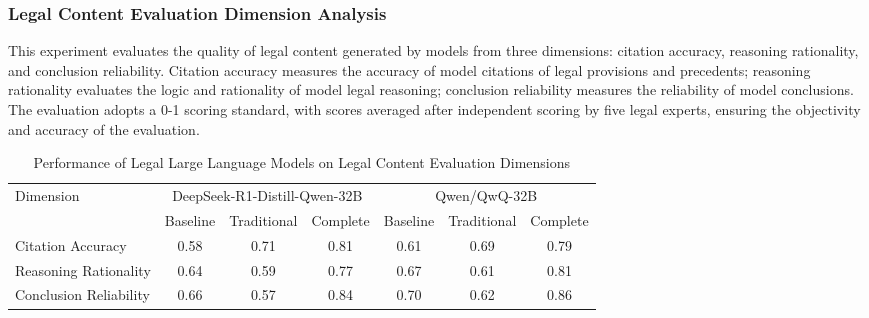 \documentclass{article}
\theoremstyle{plain}
\theoremstyle{definition}
\begin{document}
\FloatBarrier
\subsubsection{Legal Content Evaluation Dimension Analysis}
\label{sec4.2.3}

This experiment evaluates the quality of legal content generated by models from three dimensions: citation accuracy, reasoning rationality, and conclusion reliability. Citation accuracy measures the accuracy of model citations of legal provisions and precedents; reasoning rationality evaluates the logic and rationality of model legal reasoning; conclusion reliability measures the reliability of model conclusions. The evaluation adopts a 0-1 scoring standard, with scores averaged after independent scoring by five legal experts, ensuring the objectivity and accuracy of the evaluation.

\begin{table}[htbp]
\centering
\caption{Performance of Legal Large Language Models on Legal Content Evaluation Dimensions}
\label{tab3}
\renewcommand{\arraystretch}{1.2}
\begin{tabularx}{\textwidth}{X *{6}{c}}
\toprule
\multirow{2}{*}{Dimension} & \multicolumn{3}{c}{DeepSeek-R1-Distill-Qwen-32B} & \multicolumn{3}{c}{Qwen/QwQ-32B} \\
\cmidrule(lr){2-4} \cmidrule(lr){5-7}
 & Baseline & Traditional & Complete & Baseline & Traditional & Complete \\
\midrule
Citation Accuracy & 0.58 & 0.71 & 0.81 & 0.61 & 0.69 & 0.79 \\
Reasoning Rationality & 0.64 & 0.59 & 0.77 & 0.67 & 0.61 & 0.81 \\
Conclusion Reliability & 0.66 & 0.57 & 0.84 & 0.70 & 0.62 & 0.86 \\
\bottomrule
\end{tabularx}
\end{table}
\end{document}
